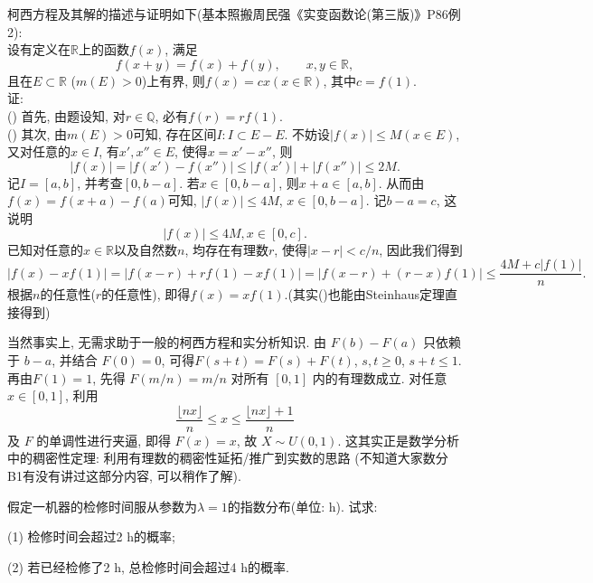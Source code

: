 \documentclass[standard]{ExBook}
\renewenvironment{shaded}{%
  \def\FrameCommand{\fboxsep=\FrameSep \colorbox{shadecolor}}%
  \MakeFramed{\advance\hsize-\width \FrameRestore}%
}{%
  \endMakeFramed
}
\begin{document}
\begin{qitems}
\textcolor{themeColor}{\selectfont {} 柯西方程及其解的描述与证明如下(基本照搬周民强《实变函数论(第三版)》P86例2):\\
设有定义在$\mathbb{R}$上的函数$f(x)$, 满足
$$f(x+y)=f(x)+f(y),\qquad x,y\in\mathbb{R},$$
且在$E\subset\mathbb{R}$ ($m(E)>0$)上有界, 则$f(x)=cx(x\in\mathbb{R})$, 其中$c=f(1)$.\\
证:\\
() 首先, 由题设知, 对$r\in\mathbb{Q}$, 必有$f(r)=rf(1)$.\\
() 其次, 由$m(E)>0$可知, 存在区间$I:I\subset E-E$. 不妨设$|f(x)|\leq M(x\in E)$, 又对任意的$x\in I$, 有$x',x''\in E$, 使得$x=x'-x''$, 则
$$|f(x)|=|f(x')-f(x'')|\leq |f(x')|+|f(x'')|\leq 2M.$$
记$I=[a,b]$, 并考查$[0,b-a]$. 若$x \in [0,b-a]$, 则$x+a\in[a,b]$. 从而由$f(x)=f(x+a)-f(a)$可知, $|f(x)|\leq 4M$, $x\in[0,b-a]$. 记$b-a=c$, 这说明
$$|f(x)|\leq 4M,x\in[0,c].$$
已知对任意的$x\in\mathbb{R}$以及自然数$n$, 均存在有理数$r$, 使得$|x-r|<c/n$, 因此我们得到
$$|f(x)-xf(1)|=|f(x-r)+rf(1)-xf(1)|=|f(x-r)+(r-x)f(1)|\leq \frac{4M+c|f(1)|}{n}.$$
根据$n$的任意性($r$的任意性), 即得$f(x)=xf(1)$.\qquad(其实()也能由Steinhaus定理直接得到)} 

\textcolor{themeColor}{\selectfont {} 
当然事实上, 无需求助于一般的柯西方程和实分析知识. 由 $F(b)-F(a)$ 只依赖于 $b-a$, 并结合 $F(0)=0$, 可得$F(s+t)=F(s)+F(t)$, $s,t\geq0$, $s+t\leq1$. 再由$F(1)=1$, 先得 $F(m/n)=m/n$ 对所有 $[0,1]$ 内的有理数成立. 对任意 $x\in[0,1]$, 利用
$$
\frac{\lfloor nx\rfloor}{n}\leq x\leq\frac{\lfloor nx\rfloor+1}{n}
$$
及 \(F\) 的单调性进行夹逼, 即得 \(F(x)=x\), 故 \(X\sim U(0,1)\).
这其实正是数学分析中的稠密性定理: 利用有理数的稠密性延拓/推广到实数的思路 (不知道大家数分B1有没有讲过这部分内容, 可以稍作了解).
}

\vspace{2.5cm-5em}

    \begin{bbox}
    \begin{shaded}
        \qitem
假定一机器的检修时间服从参数为$\lambda=1$的指数分布(单位: h). 试求: 

(1) 检修时间会超过2 h的概率;

(2) 若已经检修了2 h, 总检修时间会超过4 h的概率.
    \end{shaded}
    \end{bbox}

\vspace{\dimexpr2.5cm-5em\relax}


\end{qitems}
\end{document}
